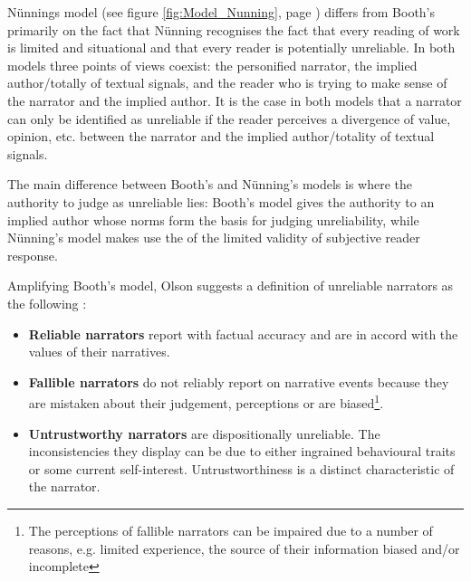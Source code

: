 
N\"unnings model (see figure \ref{fig:Model_Nunning}, page \pageref{fig:Model_Nunning}) differs from Booth's primarily on the fact that N\"unning recognises the fact that every reading of work is limited and situational and that every reader is potentially unreliable\cite[98]{Olson}. In both models three points of views coexist: the personified narrator, the implied author/totally of textual signals, and the reader who is trying to make sense of the narrator and the implied author. It is the case in both models that a narrator can only be identified as unreliable if the reader perceives a divergence of value, opinion, etc. between the narrator and the implied author/totality of textual signals.

The main difference between Booth's and N\"unning's models is where the authority to judge as unreliable lies: Booth's model gives the authority to an implied author whose norms form the basis for judging unreliability, while N\"unning's model makes use the of the limited validity of subjective reader response.

Amplifying Booth's model, Olson suggests a definition of unreliable narrators as the following \cite[101-102]{Olson}:
\begin{itemize}
	\item \textbf{Reliable narrators} report with factual accuracy and are in accord with the values of their narratives.
	\item \textbf{Fallible narrators} do not reliably report on narrative events because they are mistaken about their judgement, perceptions or are biased\footnote{The perceptions of fallible narrators can be impaired due to a number of reasons, e.g. limited experience, the source of their information biased and/or incomplete}.
	\item \textbf{Untrustworthy narrators} are dispositionally unreliable. The inconsistencies they display can be due to either ingrained behavioural traits or some current self-interest. Untrustworthiness is a distinct characteristic of the narrator.
\end{itemize}